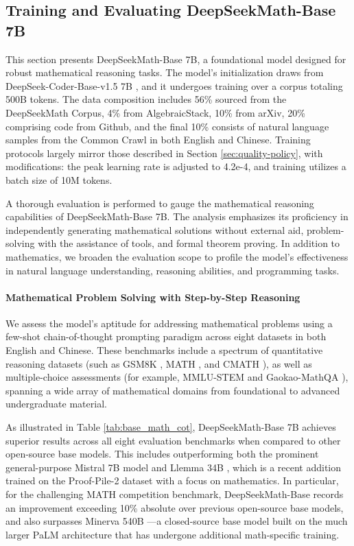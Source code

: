 \subsection{Training and Evaluating DeepSeekMath-Base 7B}

This section presents DeepSeekMath-Base 7B, a foundational model designed for robust mathematical reasoning tasks. The model's initialization draws from DeepSeek-Coder-Base-v1.5 7B \citep{deepseek-coder}, and it undergoes training over a corpus totaling 500B tokens. The data composition includes 56\% sourced from the DeepSeekMath Corpus, 4\% from AlgebraicStack, 10\% from arXiv, 20\% comprising code from Github, and the final 10\% consists of natural language samples from the Common Crawl in both English and Chinese. Training protocols largely mirror those described in Section \ref{sec:quality-policy}, with modifications: the peak learning rate is adjusted to 4.2e-4, and training utilizes a batch size of 10M tokens.

A thorough evaluation is performed to gauge the mathematical reasoning capabilities of DeepSeekMath-Base 7B. The analysis emphasizes its proficiency in independently generating mathematical solutions without external aid, problem-solving with the assistance of tools, and formal theorem proving. In addition to mathematics, we broaden the evaluation scope to profile the model’s effectiveness in natural language understanding, reasoning abilities, and programming tasks.

\paragraph{Mathematical Problem Solving with Step-by-Step Reasoning}

We assess the model's aptitude for addressing mathematical problems using a few-shot chain-of-thought prompting paradigm \citep{cot} across eight datasets in both English and Chinese. These benchmarks include a spectrum of quantitative reasoning datasets (such as GSM8K \citep{gsm8k}, MATH \citep{MATH}, and CMATH \citep{wei2023cmath}), as well as multiple-choice assessments (for example, MMLU-STEM \citep{mmlu} and Gaokao-MathQA \citep{agieval}), spanning a wide array of mathematical domains from foundational to advanced undergraduate material.

As illustrated in Table \ref{tab:base_math_cot}, DeepSeekMath-Base 7B achieves superior results across all eight evaluation benchmarks when compared to other open-source base models. This includes outperforming both the prominent general-purpose Mistral 7B model \citep{mistral} and Llemma 34B \citep{llemma}, which is a recent addition trained on the Proof-Pile-2 dataset \citep{llemma} with a focus on mathematics. In particular, for the challenging MATH competition benchmark, DeepSeekMath-Base records an improvement exceeding 10\% absolute over previous open-source base models, and also surpasses Minerva 540B \citep{minerva}—a closed-source base model built on the much larger PaLM architecture \citep{palm} that has undergone additional math-specific training.

